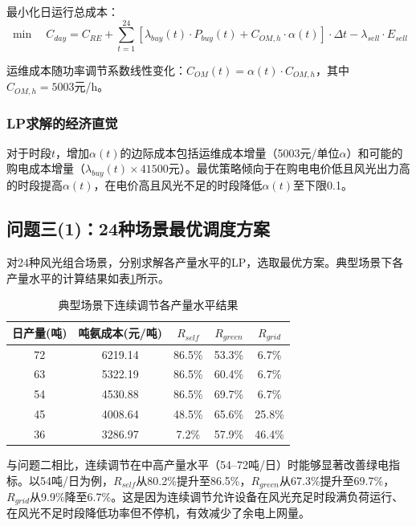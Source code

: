 最小化日运行总成本：
\begin{equation}\label{eq:q3_obj}
\min \quad C_{day} = C_{RE} + \sum_{t=1}^{24} [\lambda_{buy}(t) \cdot P_{buy}(t) + C_{OM,h} \cdot \alpha(t)] \cdot \Delta t - \lambda_{sell} \cdot E_{sell}
\end{equation}

运维成本随功率调节系数线性变化：$C_{OM}(t) = \alpha(t) \cdot C_{OM,h}$，其中$C_{OM,h} = 5003$元/h。

\subsubsection{LP求解的经济直觉}

对于时段$t$，增加$\alpha(t)$的边际成本包括运维成本增量（5003元/单位$\alpha$）和可能的购电成本增量（$\lambda_{buy}(t) \times 41500$元）。最优策略倾向于在购电电价低且风光出力高的时段提高$\alpha(t)$，在电价高且风光不足的时段降低$\alpha(t)$至下限0.1。

\subsection{问题三(1)：24种场景最优调度方案}

对24种风光组合场景，分别求解各产量水平的LP，选取最优方案。典型场景下各产量水平的计算结果如表\ref{tab:q3_typical}所示。

\begin{table}[H]
\centering
\caption{典型场景下连续调节各产量水平结果}\label{tab:q3_typical}
\begin{tabular}{ccccc}
\toprule
日产量(吨) & 吨氨成本(元/吨) & $R_{self}$ & $R_{green}$ & $R_{grid}$ \\
\midrule
72 & 6219.14 & 86.5\% & 53.3\% & 6.7\% \\
63 & 5322.19 & 86.5\% & 60.4\% & 6.7\% \\
54 & 4530.88 & 86.5\% & 69.7\% & 6.7\% \\
45 & 4008.64 & 48.5\% & 65.6\% & 25.8\% \\
36 & 3286.97 & 7.2\% & 57.9\% & 46.4\% \\
\bottomrule
\end{tabular}
\end{table}

与问题二相比，连续调节在中高产量水平（54--72吨/日）时能够显著改善绿电指标。以54吨/日为例，$R_{self}$从80.2\%提升至86.5\%，$R_{green}$从67.3\%提升至69.7\%，$R_{grid}$从9.9\%降至6.7\%。这是因为连续调节允许设备在风光充足时段满负荷运行、在风光不足时段降低功率但不停机，有效减少了余电上网量。

